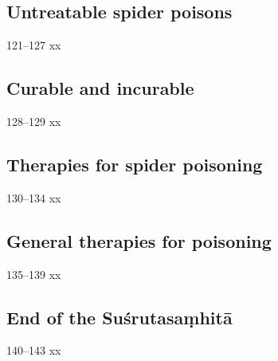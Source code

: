 \begin{translation}
 \subsection{Untreatable spider poisons}
 
 \item [121--127] xx
 
 \subsection{Curable and incurable}
 
 \item[128--129] xx
 
 \subsection{Therapies for spider poisoning}
 
 \item [130--134] xx
 
\subsection{General therapies for poisoning}

\item [135--139] xx

\subsection{End of the Suśrutasaṃhitā}

\item[140--143] xx
 
\end{translation}